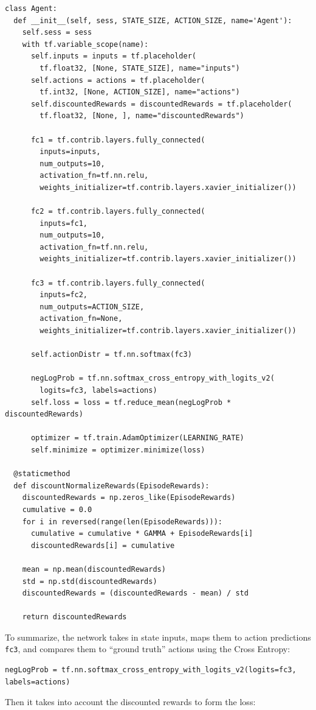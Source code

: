 \documentclass[20pt]{extarticle}
\theoremstyle{plain}
\theoremstyle{definition}
\theoremstyle{remark}
\newcommand{\0}{\varnothing}
\newcommand{\<}{\langle}
\renewcommand{\>}{\rangle}
\begin{document}
\scriptsize
\begin{lstlisting}
class Agent:
  def __init__(self, sess, STATE_SIZE, ACTION_SIZE, name='Agent'):
    self.sess = sess
    with tf.variable_scope(name):
      self.inputs = inputs = tf.placeholder(
        tf.float32, [None, STATE_SIZE], name="inputs")
      self.actions = actions = tf.placeholder(
        tf.int32, [None, ACTION_SIZE], name="actions")
      self.discountedRewards = discountedRewards = tf.placeholder(
        tf.float32, [None, ], name="discountedRewards")

      fc1 = tf.contrib.layers.fully_connected(
        inputs=inputs,
        num_outputs=10,
        activation_fn=tf.nn.relu,
        weights_initializer=tf.contrib.layers.xavier_initializer())

      fc2 = tf.contrib.layers.fully_connected(
        inputs=fc1,
        num_outputs=10,
        activation_fn=tf.nn.relu,
        weights_initializer=tf.contrib.layers.xavier_initializer())

      fc3 = tf.contrib.layers.fully_connected(
        inputs=fc2,
        num_outputs=ACTION_SIZE,
        activation_fn=None,
        weights_initializer=tf.contrib.layers.xavier_initializer())

      self.actionDistr = tf.nn.softmax(fc3)

      negLogProb = tf.nn.softmax_cross_entropy_with_logits_v2(
        logits=fc3, labels=actions)
      self.loss = loss = tf.reduce_mean(negLogProb * discountedRewards)

      optimizer = tf.train.AdamOptimizer(LEARNING_RATE)
      self.minimize = optimizer.minimize(loss)

  @staticmethod
  def discountNormalizeRewards(EpisodeRewards):
    discountedRewards = np.zeros_like(EpisodeRewards)
    cumulative = 0.0
    for i in reversed(range(len(EpisodeRewards))):
      cumulative = cumulative * GAMMA + EpisodeRewards[i]
      discountedRewards[i] = cumulative

    mean = np.mean(discountedRewards)
    std = np.std(discountedRewards)
    discountedRewards = (discountedRewards - mean) / std

    return discountedRewards
\end{lstlisting}
\normalsize

To summarize, the network takes in state inputs, maps them to action predictions \lstinline{fc3}, and compares them to ``ground truth'' actions using the Cross Entropy:

\tiny
\begin{lstlisting}
negLogProb = tf.nn.softmax_cross_entropy_with_logits_v2(logits=fc3, labels=actions)
\end{lstlisting}
\normalsize
Then it takes into account the discounted rewards to form the loss:
\end{document}
